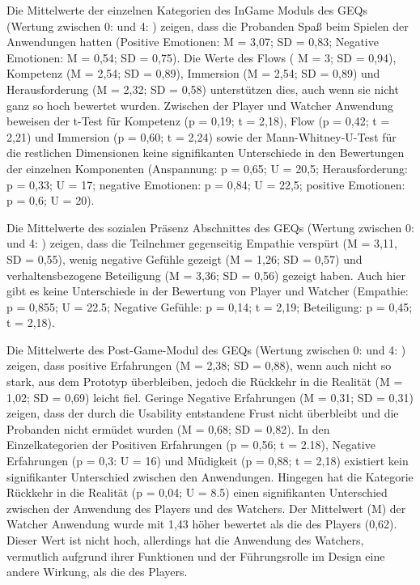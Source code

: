 Die Mittelwerte der einzelnen Kategorien des InGame Moduls des \ac{GEQ}s (Wertung zwischen 0:  und 4: ) zeigen, dass die Probanden Spaß beim Spielen der Anwendungen hatten (Positive Emotionen: M = 3,07; SD = 0,83; Negative Emotionen: M = 0,54; SD = 0,75). Die Werte des Flows ( M = 3; SD = 0,94), Kompetenz (M = 2,54; SD = 0,89), Immersion (M = 2,54; SD = 0,89) und Herausforderung (M = 2,32; SD = 0,58) unterstützen dies, auch wenn sie nicht ganz so hoch bewertet wurden. Zwischen der Player und Watcher Anwendung beweisen der t-Test für Kompetenz (p = 0,19; t = 2,18), Flow (p = 0,42; t = 2,21) und Immersion (p = 0,60; t = 2,24) sowie der Mann-Whitney-U-Test für die restlichen Dimensionen keine signifikanten Unterschiede in den Bewertungen der einzelnen Komponenten (Anspannung: p = 0,65; U = 20,5; Herausforderung: p = 0,33; U = 17; negative Emotionen: p = 0,84; U = 22,5; positive Emotionen: p = 0,6; U = 20).

Die Mittelwerte des sozialen Präsenz Abschnittes des \ac{GEQ}s (Wertung zwischen 0:  und 4: ) zeigen, dass die Teilnehmer gegenseitig Empathie verspürt (M = 3,11, SD = 0,55), wenig negative Gefühle gezeigt (M = 1,26; SD = 0,57) und verhaltensbezogene Beteiligung (M = 3,36; SD = 0,56) gezeigt haben. Auch hier gibt es keine Unterschiede in der Bewertung von Player und Watcher (Empathie: p = 0,855; U = 22.5; Negative Gefühle: p = 0,14; t = 2,19; Beteiligung: p = 0,45; t = 2,18).

Die Mittelwerte des Post-Game-Modul des \ac{GEQ}s (Wertung zwischen 0:  und 4: ) zeigen, dass positive Erfahrungen (M = 2,38; SD = 0,88), wenn auch nicht so stark, aus dem Prototyp überbleiben, jedoch die Rückkehr in die Realität (M = 1,02; SD = 0,69) leicht fiel. Geringe Negative Erfahrungen (M = 0,31; SD = 0,31) zeigen, dass der durch die Usability entstandene Frust nicht überbleibt und die Probanden nicht ermüdet wurden (M = 0,68; SD = 0,82). In den Einzelkategorien der Positiven Erfahrungen (p = 0,56; t = 2.18), Negative Erfahrungen (p = 0,3: U = 16) und Müdigkeit (p = 0,88; t = 2,18) existiert kein signifikanter Unterschied zwischen den Anwendungen. Hingegen hat die Kategorie Rückkehr in die Realität (p = 0,04; U = 8.5) einen signifikanten Unterschied zwischen der Anwendung des Players und des Watchers. Der Mittelwert (M) der Watcher Anwendung wurde mit 1,43 höher bewertet als die des Players (0,62). Dieser Wert ist nicht hoch, allerdings hat die Anwendung des Watchers, vermutlich aufgrund ihrer Funktionen und der Führungsrolle im Design eine andere Wirkung, als die des Players.

